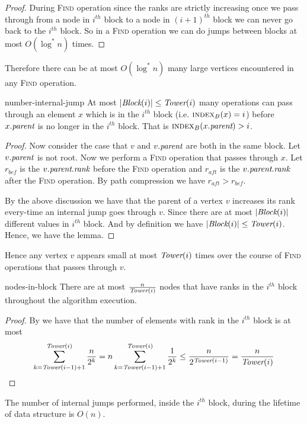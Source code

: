\begin{proof}
During \textsc{Find} operation since the ranks are strictly increasing once we pass through from a node in $i^{th}$ block to a node in $(i+1)^{th}$ block we can never go back to the $i^{th}$ block. So in a \textsc{Find} operation we can do jumps between blocks at most $O(\log^* n)$ times. 
\end{proof}
Therefore there can be at most $O(\log^*n)$ many large vertices encountered in any \textsc{Find} operation.
\begin{lemma}{}{number-internal-jump}
	At most $|\emph{Block}(i)|\leq \emph{Tower}(i)$ many  operations can pass through an element $x$ which is in the $i^{th}$ block (i.e. $\textsc{index}_B(x)=i$) before $x.\emph{parent}$ is no longer in the $i^{th}$ block. That is $\textsc{index}_B(x.\emph{parent})>i$.
\end{lemma}
\begin{proof}
Now consider the case that $v$ and $v.\emph{parent}$ are both in the same block. Let $v.\emph{parent}$ is not root. Now we perform a \textsc{Find} operation that passes through $x$. Let $r_{bef}$ is the $v.\emph{parent}.\emph{rank}$ before the \textsc{Find} operation and $r_{aft}$ is the $v.\emph{parent}.\emph{rank}$ after the \textsc{Find} operation. By path compression we have $r_{aft}>r_{bef}$. 

By the above discussion we have that the parent of a vertex $v$ increases its rank every-time an internal jump goes through $v$. Since there are at most $|\emph{Block}(i)|$ different values in $i^{th}$ block. And by definition we have $|\emph{Block}(i)|\leq \emph{Tower}(i)$. Hence, we have the lemma. 
\end{proof}
Hence any vertex $v$ appears small at most $\emph{Tower}(i)$ times over the course of \textsc{Find} operations that passes through $v$. 
\begin{lemma}{}{nodes-in-block}
	There are at most $\frac{n}{\emph{Tower}(i)}$ nodes that have ranks in the $i^{th}$ block throughout the algorithm execution.
\end{lemma}
\begin{proof}
By  we have that the number of elements with rank in the $i^{th}$ block is at most $$\sum\limits_{k=\emph{Tower}(i-1)+1}^{\emph{Tower}(i)}\frac{n}{2^k}=n\sum\limits_{k=\emph{Tower}(i-1)+1}^{\emph{Tower}(i)}\frac1{2^k}\leq \frac{n}{2^{\emph{Tower}(i-1)}}=\frac{n}{\emph{Tower}(i)}$$
\end{proof}
\begin{lemma}{}{}
	The number of internal jumps performed, inside the $i^{th}$ block, during the lifetime of  data structure is $O(n)$.
\end{lemma}
